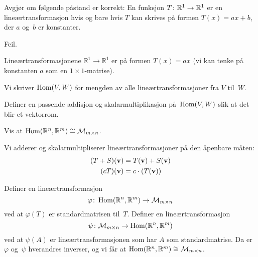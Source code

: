 
\begin{oppgave}
Avgjør om følgende påstand er korrekt:
En funksjon $T \colon \mathbb{R}^1 \to \mathbb{R}^1$ er en lineærtransformasjon
hvis og bare hvis $T$ kan skrives på formen $T(x) = ax + b$,
der $a$ og~$b$ er konstanter.
\end{oppgave}
\begin{losning}
Feil.

\noindent
Lineærtransformasjonene $\mathbb{R}^1\rightarrow \mathbb{R}^1$ er på
formen $T(x)=ax$ (vi kan tenke på konstanten $a$ som en
$1\times 1$-matrise).
\end{losning}

\begin{oppgave}
Vi skriver $\operatorname{Hom}(V,W)$ for mengden av alle lineærtransformasjoner fra
$V$ til~$W$.
\begin{punkt}
Definer en passende addisjon og skalarmultiplikasjon på~$\operatorname{Hom}(V,W)$
slik at det blir et vektorrom.
\end{punkt}
\begin{punkt}
Vis at $\operatorname{Hom}(\mathbb{R}^n, \mathbb{R}^m) \cong \mathcal{M}_{m \times n}$.
\end{punkt}
\end{oppgave}

\begin{losning}
\begin{punkt}
Vi adderer og skalarmultipliserer lineærtransformasjoner på den
åpenbare måten:
\begin{align*}
(T + S)(\mathbf{v}) &= T(\mathbf{v}) + S(\mathbf{v}) \\
(cT)(\mathbf{v}) &= c \cdot (T(\mathbf{v}))
\end{align*}
\end{punkt}
\begin{punkt}
Definer en lineærtransformasjon
\[
\varphi \colon \operatorname{Hom}(\mathbb{R}^n, \mathbb{R}^m) \to \mathcal{M}_{m \times n}
\]
ved at $\varphi(T)$ er standardmatrisen til~$T$.  Definer en
lineærtransformasjon
\[
\psi \colon \mathcal{M}_{m \times n} \to \operatorname{Hom}(\mathbb{R}^n, \mathbb{R}^m)
\]
ved at $\psi(A)$ er lineærtransformasjonen som har $A$ som
standardmatrise.  Da er $\varphi$ og~$\psi$ hverandres inverser, og vi
får at $\operatorname{Hom}(\mathbb{R}^n, \mathbb{R}^m) \cong \mathcal{M}_{m \times n}$.
\end{punkt}
\end{losning}




